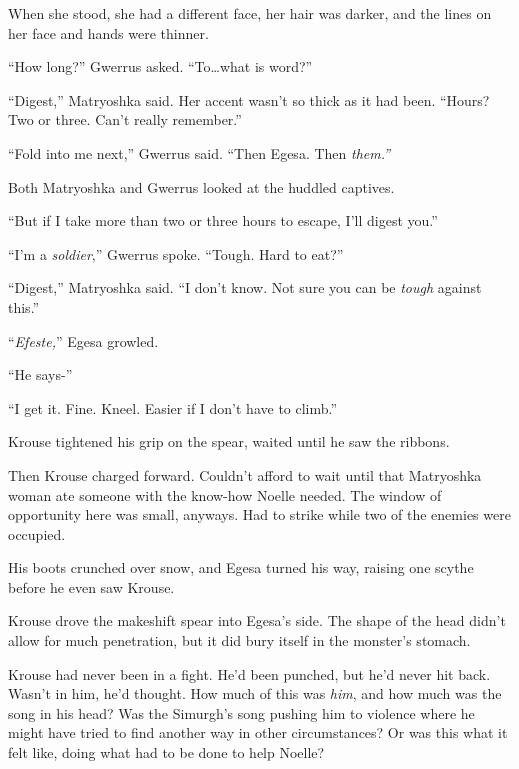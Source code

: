 When she stood, she had a different face, her hair was darker, and the lines on her face and hands were thinner.



``How long?'' Gwerrus asked.  ``To\ldots what is word?''



``Digest,'' Matryoshka said.  Her accent wasn't so thick as it had been.  ``Hours?  Two or three.  Can't really remember.''



``Fold into me next,'' Gwerrus said.  ``Then Egesa.  Then \emph{them.''}



Both Matryoshka and Gwerrus looked at the huddled captives.



``But if I take more than two or three hours to escape, I'll digest you.''



``I'm a \emph{soldier},'' Gwerrus spoke.  ``Tough.  Hard to eat?''



``Digest,'' Matryoshka said.  ``I don't know.  Not sure you can be \emph{tough} against this.''



``\emph{Efeste,}'' Egesa growled.



``He says-''



``I get it.  Fine.  Kneel.  Easier if I don't have to climb.''



Krouse tightened his grip on the spear, waited until he saw the ribbons.



Then Krouse charged forward.  Couldn't afford to wait until that Matryoshka woman ate someone with the know-how Noelle needed.  The window of opportunity here was small, anyways.  Had to strike while two of the enemies were occupied.



His boots crunched over snow, and Egesa turned his way, raising one scythe before he even saw Krouse.



Krouse drove the makeshift spear into Egesa's side.  The shape of the head didn't allow for much penetration, but it did bury itself in the monster's stomach.



Krouse had never been in a fight.  He'd been punched, but he'd never hit back.  Wasn't in him, he'd thought.  How much of this was \emph{him}, and how much was the song in his head?  Was the Simurgh's song pushing him to violence where he might have tried to find another way in other circumstances?  Or was this what it felt like, doing what had to be done to help Noelle?



